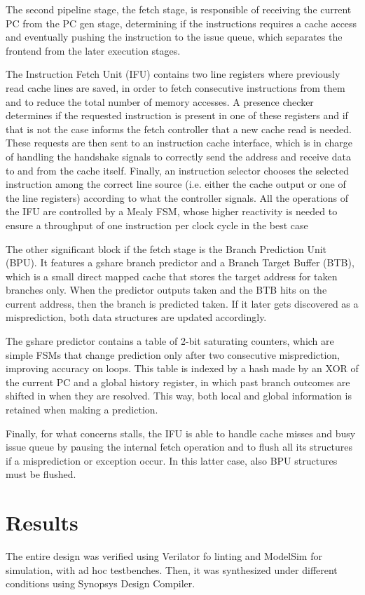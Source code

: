 \documentclass[a4paper,12pt]{article}
\begin{document}
The second pipeline stage, the fetch stage, is responsible of receiving the current PC from the PC gen stage, determining if the instructions requires a cache access and eventually pushing the instruction to the issue queue, which separates the frontend from the later execution stages. 

The Instruction Fetch Unit (IFU) contains two line registers where previously read cache lines are saved, in order to fetch consecutive instructions from them and to reduce the total number of memory accesses. A presence checker determines if the requested instruction is present in one of these registers and if that is not the case informs the fetch controller that a new cache read is needed. These requests are then sent to an instruction cache interface, which is in charge of handling the handshake signals to correctly send the address and receive data to and from the cache itself. Finally, an instruction selector chooses the selected instruction among the correct line source (i.e. either the cache output or one of the line registers) according to what the controller signals. All the operations of the IFU are controlled by a Mealy FSM, whose higher reactivity is needed to ensure a throughput of one instruction per clock cycle in the best case

The other significant block if the fetch stage is the Branch Prediction Unit (BPU). It features a gshare branch predictor and a Branch Target Buffer (BTB), which is a small direct mapped cache that stores the target address for taken branches only. When the predictor outputs taken and the BTB hits on the current address, then the branch is predicted taken. If it later gets discovered as a misprediction, both data structures are updated accordingly.

The gshare predictor contains a table of 2-bit saturating counters, which are simple FSMs that change prediction only after two consecutive misprediction, improving accuracy on loops. This table is indexed by a hash made by an XOR of the current PC and a global history register, in which past branch outcomes are shifted in when they are resolved. This way, both local and global information is retained when making a prediction.

Finally, for what concerns stalls, the IFU is able to handle cache misses and busy issue queue by pausing the internal fetch operation and to flush all its structures if a misprediction or exception occur. In this latter case, also BPU structures must be flushed.

\section{Results}
The entire design was verified using Verilator fo linting and ModelSim for simulation, with ad hoc testbenches. Then, it was synthesized under different conditions using Synopsys Design Compiler.
\end{document}
